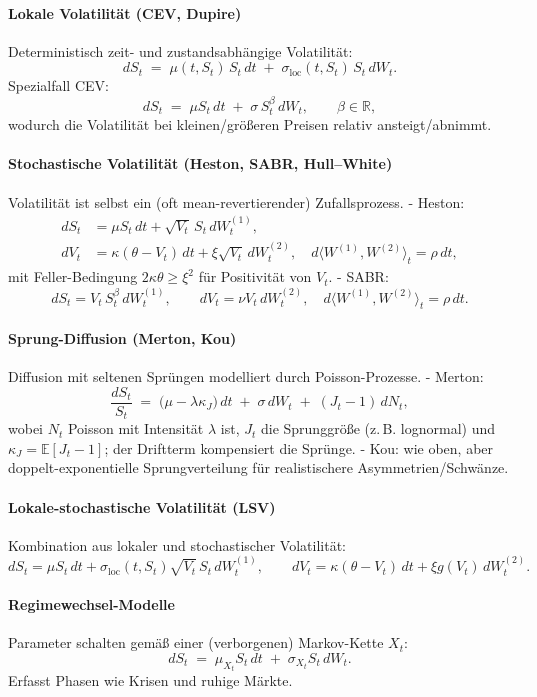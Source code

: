 \paragraph{Lokale Volatilität (CEV, Dupire)}
Deterministisch zeit- und zustandsabhängige Volatilität:
$$
dS_t \;=\; \mu(t,S_t)\,S_t\,dt \;+\; \sigma_{\mathrm{loc}}(t,S_t)\,S_t\,dW_t.
$$
Spezialfall CEV:
$$
dS_t \;=\; \mu S_t\,dt \;+\; \sigma\,S_t^{\beta}\,dW_t,\qquad \beta\in\mathbb R,
$$
wodurch die Volatilität bei kleinen/größeren Preisen relativ ansteigt/abnimmt.

\paragraph{Stochastische Volatilität (Heston, SABR, Hull--White)}
Volatilität ist selbst ein (oft mean-revertierender) Zufallsprozess.
- Heston:
$$
\begin{aligned}
dS_t &= \mu S_t\,dt + \sqrt{V_t}\,S_t\,dW_t^{(1)},\\
dV_t &= \kappa(\theta - V_t)\,dt + \xi\sqrt{V_t}\,dW_t^{(2)},\quad d \langle W^{(1)},W^{(2)}\rangle_t=\rho\,dt,
\end{aligned}
$$
mit Feller-Bedingung $2\kappa\theta\ge \xi^2$ für Positivität von $V_t$.
- SABR:
$$
dS_t = V_t\,S_t^{\beta}\,dW_t^{(1)},\qquad dV_t=\nu V_t\,dW_t^{(2)},\quad d \langle W^{(1)},W^{(2)}\rangle_t=\rho\,dt.
$$

\paragraph{Sprung-Diffusion (Merton, Kou)}
Diffusion mit seltenen Sprüngen modelliert durch Poisson-Prozesse.
- Merton:
$$
\frac{dS_t}{S_t} \;=\; \big(\mu - \lambda \kappa_J\big)\,dt \;+\; \sigma\,dW_t \;+\; (J_t-1)\,dN_t,
$$
wobei $N_t$ Poisson mit Intensität $\lambda$ ist, $J_t$ die Sprunggröße (z.\,B. lognormal) und $\kappa_J=\mathbb E[J_t-1]$; der Driftterm kompensiert die Sprünge.
- Kou: wie oben, aber doppelt-exponentielle Sprungverteilung für realistischere Asymmetrien/Schwänze.

\paragraph{Lokale-stochastische Volatilität (LSV)}
Kombination aus lokaler und stochastischer Volatilität:
$$
dS_t = \mu S_t\,dt + \sigma_{\mathrm{loc}}(t,S_t)\sqrt{V_t}\,S_t\,dW_t^{(1)},\qquad
dV_t = \kappa(\theta - V_t)\,dt + \xi g(V_t)\,dW_t^{(2)}.
$$

\paragraph{Regimewechsel-Modelle}
Parameter schalten gemäß einer (verborgenen) Markov-Kette $X_t$:
$$
dS_t \;=\; \mu_{X_t} S_t\,dt \;+\; \sigma_{X_t} S_t\,dW_t.
$$
Erfasst Phasen wie Krisen und ruhige Märkte.

